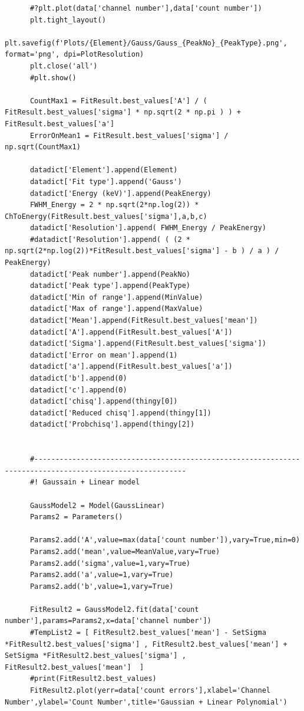 \documentclass[11pt,a4paper]{article}
\begin{document}
\begin{verbatim}
      #?plt.plot(data['channel number'],data['count number'])
      plt.tight_layout()
      plt.savefig(f'Plots/{Element}/Gauss/Gauss_{PeakNo}_{PeakType}.png', format='png', dpi=PlotResolution)
      plt.close('all')
      #plt.show()

      CountMax1 = FitResult.best_values['A'] / ( FitResult.best_values['sigma'] * np.sqrt(2 * np.pi ) ) + FitResult.best_values['a']
      ErrorOnMean1 = FitResult.best_values['sigma'] / np.sqrt(CountMax1)

      datadict['Element'].append(Element)
      datadict['Fit type'].append('Gauss')
      datadict['Energy (keV)'].append(PeakEnergy)
      FWHM_Energy = 2 * np.sqrt(2*np.log(2)) * ChToEnergy(FitResult.best_values['sigma'],a,b,c)
      datadict['Resolution'].append( FWHM_Energy / PeakEnergy)
      #datadict['Resolution'].append( ( (2 * np.sqrt(2*np.log(2))*FitResult.best_values['sigma'] - b ) / a ) / PeakEnergy)
      datadict['Peak number'].append(PeakNo)
      datadict['Peak type'].append(PeakType)
      datadict['Min of range'].append(MinValue)
      datadict['Max of range'].append(MaxValue)
      datadict['Mean'].append(FitResult.best_values['mean'])
      datadict['A'].append(FitResult.best_values['A'])
      datadict['Sigma'].append(FitResult.best_values['sigma'])
      datadict['Error on mean'].append(1)
      datadict['a'].append(FitResult.best_values['a'])
      datadict['b'].append(0)
      datadict['c'].append(0)
      datadict['chisq'].append(thingy[0])
      datadict['Reduced chisq'].append(thingy[1])
      datadict['Probchisq'].append(thingy[2])

      
      #----------------------------------------------------------------------------------------------------------
      #! Gaussain + Linear model 

      GaussModel2 = Model(GaussLinear)
      Params2 = Parameters()

      Params2.add('A',value=max(data['count number']),vary=True,min=0)
      Params2.add('mean',value=MeanValue,vary=True)
      Params2.add('sigma',value=1,vary=True)
      Params2.add('a',value=1,vary=True)
      Params2.add('b',value=1,vary=True)

      FitResult2 = GaussModel2.fit(data['count number'],params=Params2,x=data['channel number'])
      #TempList2 = [ FitResult2.best_values['mean'] - SetSigma *FitResult2.best_values['sigma'] , FitResult2.best_values['mean'] + SetSigma *FitResult2.best_values['sigma'] , FitResult2.best_values['mean']  ] 
      #print(FitResult2.best_values)
      FitResult2.plot(yerr=data['count errors'],xlabel='Channel Number',ylabel='Count Number',title='Gaussian + Linear Polynomial')


\end{verbatim}
\end{document}
